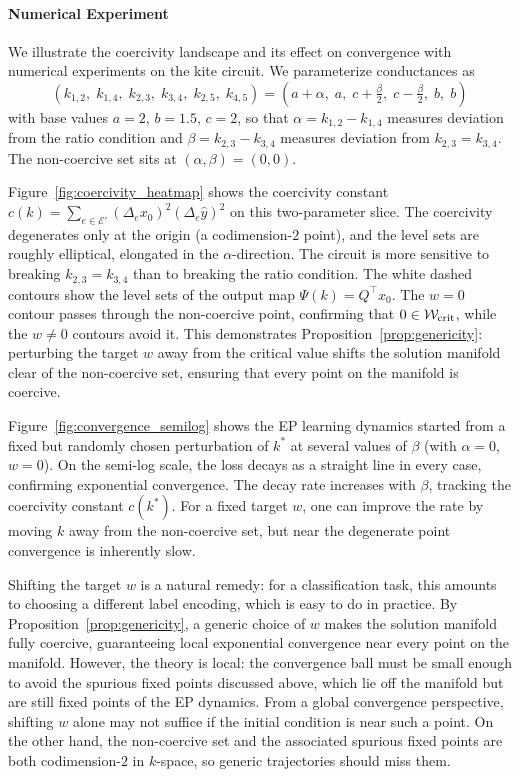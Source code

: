 \documentclass{siamart}
\begin{document}
\paragraph{Numerical Experiment}
We illustrate the coercivity landscape and its effect on convergence with numerical experiments on the kite circuit. We parameterize conductances as
\[
(k_{1,2},\; k_{1,4},\; k_{2,3},\; k_{3,4},\; k_{2,5},\; k_{4,5}) = (a + \alpha,\; a,\; c + \tfrac{\beta}{2},\; c - \tfrac{\beta}{2},\; b,\; b)
\]
with base values $a = 2$, $b = 1.5$, $c = 2$, so that $\alpha = k_{1,2} - k_{1,4}$ measures deviation from the ratio condition and $\beta = k_{2,3} - k_{3,4}$ measures deviation from $k_{2,3} = k_{3,4}$. The non-coercive set sits at $(\alpha, \beta) = (0,0)$.

Figure~\ref{fig:coercivity_heatmap} shows the coercivity constant $c(k) = \sum_{e \in \mathcal{E}'} (\Delta_e x_0)^2 (\Delta_e \hat{y})^2$ on this two-parameter slice. The coercivity degenerates only at the origin (a codimension-$2$ point), and the level sets are roughly elliptical, elongated in the $\alpha$-direction. The circuit is more sensitive to breaking $k_{2,3} = k_{3,4}$ than to breaking the ratio condition. The white dashed contours show the level sets of the output map $\Psi(k) = Q^\top x_0$. The $w = 0$ contour passes through the non-coercive point, confirming that $0 \in \mathcal{W}_{\rm crit}$, while the $w \neq 0$ contours avoid it. This demonstrates Proposition~\ref{prop:genericity}: perturbing the target $w$ away from the critical value shifts the solution manifold clear of the non-coercive set, ensuring that every point on the manifold is coercive.

Figure~\ref{fig:convergence_semilog} shows the EP learning dynamics started from a fixed but randomly chosen perturbation of $k^*$ at several values of $\beta$ (with $\alpha = 0$, $w = 0$). On the semi-log scale, the loss decays as a straight line in every case, confirming exponential convergence. The decay rate increases with $\beta$, tracking the coercivity constant $c(k^*)$. For a fixed target $w$, one can improve the rate by moving $k$ away from the non-coercive set, but near the degenerate point convergence is inherently slow.

Shifting the target $w$ is a natural remedy: for a classification task, this amounts to choosing a different label encoding, which is easy to do in practice. By Proposition~\ref{prop:genericity}, a generic choice of $w$ makes the solution manifold fully coercive, guaranteeing local exponential convergence near every point on the manifold. However, the theory is local: the convergence ball must be small enough to avoid the spurious fixed points discussed above, which lie off the manifold but are still fixed points of the EP dynamics. From a global convergence perspective, shifting $w$ alone may not suffice if the initial condition is near such a point. On the other hand, the non-coercive set and the associated spurious fixed points are both codimension-$2$ in $k$-space, so generic trajectories should miss them. 
\end{document}
